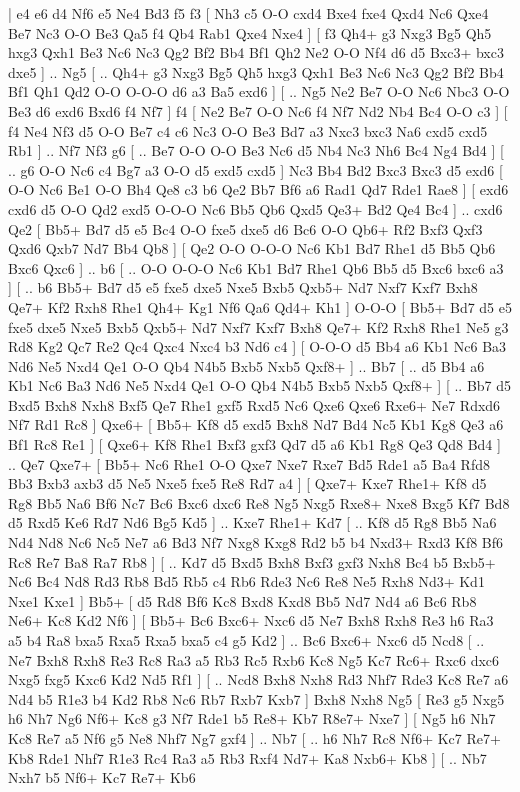 \makegametitle 
|   e4   e6    d4   Nf6    e5   Ne4    Bd3   f5    f3 [  Nh3 c5  O-O cxd4  Bxe4 fxe4  Qxd4 Nc6  Qxe4 Be7  Nc3 O-O  Be3 Qa5  f4 Qb4  Rab1 Qxe4  Nxe4   ]  [  f3 Qh4+  g3 Nxg3  Bg5 Qh5  hxg3 Qxh1  Be3 Nc6  Nc3 Qg2  Bf2 Bb4  Bf1 Qh2  Ne2 O-O  Nf4 d6  d5 Bxc3+  bxc3 dxe5   ] .. Ng5 [ .. Qh4+  g3 Nxg3  Bg5 Qh5  hxg3 Qxh1  Be3 Nc6  Nc3 Qg2  Bf2 Bb4  Bf1 Qh1  Qd2 O-O  O-O-O d6  a3 Ba5  exd6   ]  [ .. Ng5  Ne2 Be7  O-O Nc6  Nbc3 O-O  Be3 d6  exd6 Bxd6  f4 Nf7   ]  f4    [  Ne2 Be7  O-O Nc6  f4 Nf7  Nd2 Nb4  Bc4 O-O  c3   ]  [  f4 Ne4  Nf3 d5  O-O Be7  c4 c6  Nc3 O-O  Be3 Bd7  a3 Nxc3  bxc3 Na6  cxd5 cxd5  Rb1   ] .. Nf7    Nf3   g6 [ .. Be7  O-O O-O  Be3 Nc6  d5 Nb4  Nc3 Nh6  Bc4 Ng4  Bd4   ]  [ .. g6  O-O Nc6  c4 Bg7  a3 O-O  d5 exd5  cxd5   ]  Nc3   Bb4    Bd2   Bxc3    Bxc3   d5    exd6 [  O-O Nc6  Be1 O-O  Bh4 Qe8  c3 b6  Qe2 Bb7  Bf6 a6  Rad1 Qd7  Rde1 Rae8   ]  [  exd6 cxd6  d5 O-O  Qd2 exd5  O-O-O Nc6  Bb5 Qb6  Qxd5 Qe3+  Bd2 Qe4  Bc4   ] .. cxd6    Qe2 [  Bb5+ Bd7  d5 e5  Bc4 O-O  fxe5 dxe5  d6 Bc6  O-O Qb6+  Rf2 Bxf3  Qxf3 Qxd6  Qxb7 Nd7  Bb4 Qb8   ]  [  Qe2 O-O  O-O-O Nc6  Kb1 Bd7  Rhe1 d5  Bb5 Qb6  Bxc6 Qxc6   ] .. b6 [ .. O-O  O-O-O Nc6  Kb1 Bd7  Rhe1 Qb6  Bb5 d5  Bxc6 bxc6  a3   ]  [ .. b6  Bb5+ Bd7  d5 e5  fxe5 dxe5  Nxe5 Bxb5  Qxb5+ Nd7  Nxf7 Kxf7  Bxh8 Qe7+  Kf2 Rxh8  Rhe1 Qh4+  Kg1 Nf6  Qa6 Qd4+  Kh1   ]  O-O-O [  Bb5+ Bd7  d5 e5  fxe5 dxe5  Nxe5 Bxb5  Qxb5+ Nd7  Nxf7 Kxf7  Bxh8 Qe7+  Kf2 Rxh8  Rhe1 Ne5  g3 Rd8  Kg2 Qc7  Re2 Qc4  Qxc4 Nxc4  b3 Nd6  c4   ]  [  O-O-O d5  Bb4 a6  Kb1 Nc6  Ba3 Nd6  Ne5 Nxd4  Qe1 O-O  Qb4 N4b5  Bxb5 Nxb5  Qxf8+   ] .. Bb7 [ .. d5  Bb4 a6  Kb1 Nc6  Ba3 Nd6  Ne5 Nxd4  Qe1 O-O  Qb4 N4b5  Bxb5 Nxb5  Qxf8+   ]  [ .. Bb7  d5 Bxd5  Bxh8 Nxh8  Bxf5 Qe7  Rhe1 gxf5  Rxd5 Nc6  Qxe6 Qxe6  Rxe6+ Ne7  Rdxd6 Nf7  Rd1 Rc8   ]  Qxe6+ [  Bb5+ Kf8  d5 exd5  Bxh8 Nd7  Bd4 Nc5  Kb1 Kg8  Qe3 a6  Bf1 Rc8  Re1   ]  [  Qxe6+ Kf8  Rhe1 Bxf3  gxf3 Qd7  d5 a6  Kb1 Rg8  Qe3 Qd8  Bd4   ] .. Qe7    Qxe7+ [  Bb5+ Nc6  Rhe1 O-O  Qxe7 Nxe7  Rxe7 Bd5  Rde1 a5  Ba4 Rfd8  Bb3 Bxb3  axb3 d5  Ne5 Nxe5  fxe5 Re8  Rd7 a4   ]  [  Qxe7+ Kxe7  Rhe1+ Kf8  d5 Rg8  Bb5 Na6  Bf6 Nc7  Bc6 Bxc6  dxc6 Re8  Ng5 Nxg5  Rxe8+ Nxe8  Bxg5 Kf7  Bd8 d5  Rxd5 Ke6  Rd7 Nd6  Bg5 Kd5   ] .. Kxe7   Rhe1+   Kd7 [ .. Kf8  d5 Rg8  Bb5 Na6  Nd4 Nd8  Nc6 Nc5  Ne7 a6  Bd3 Nf7  Nxg8 Kxg8  Rd2 b5  b4 Nxd3+  Rxd3 Kf8  Bf6 Rc8  Re7 Ba8  Ra7 Rb8   ]  [ .. Kd7  d5 Bxd5  Bxh8 Bxf3  gxf3 Nxh8  Bc4 b5  Bxb5+ Nc6  Bc4 Nd8  Rd3 Rb8  Bd5 Rb5  c4 Rb6  Rde3 Nc6  Re8 Ne5  Rxh8 Nd3+  Kd1 Nxe1  Kxe1   ]  Bb5+ [  d5 Rd8  Bf6 Kc8  Bxd8 Kxd8  Bb5 Nd7  Nd4 a6  Bc6 Rb8  Ne6+ Kc8  Kd2 Nf6   ]  [  Bb5+ Bc6  Bxc6+ Nxc6  d5 Ne7  Bxh8 Rxh8  Re3 h6  Ra3 a5  b4 Ra8  bxa5 Rxa5  Rxa5 bxa5  c4 g5  Kd2   ] .. Bc6    Bxc6+   Nxc6    d5   Ncd8 [ .. Ne7  Bxh8 Rxh8  Re3 Rc8  Ra3 a5  Rb3 Rc5  Rxb6 Kc8  Ng5 Kc7  Rc6+ Rxc6  dxc6 Nxg5  fxg5 Kxc6  Kd2 Nd5  Rf1   ]  [ .. Ncd8  Bxh8 Nxh8  Rd3 Nhf7  Rde3 Kc8  Re7 a6  Nd4 b5  R1e3 b4  Kd2 Rb8  Nc6 Rb7  Rxb7 Kxb7   ]  Bxh8   Nxh8    Ng5 [  Re3 g5  Nxg5 h6  Nh7 Ng6  Nf6+ Kc8  g3 Nf7  Rde1 b5  Re8+ Kb7  R8e7+ Nxe7   ]  [  Ng5 h6  Nh7 Kc8  Re7 a5  Nf6 g5  Ne8 Nhf7  Ng7 gxf4   ] .. Nb7 [ .. h6  Nh7 Rc8  Nf6+ Kc7  Re7+ Kb8  Rde1 Nhf7  R1e3 Rc4  Ra3 a5  Rb3 Rxf4  Nd7+ Ka8  Nxb6+ Kb8   ]  [ .. Nb7  Nxh7 b5  Nf6+ Kc7  Re7+ Kb6 
